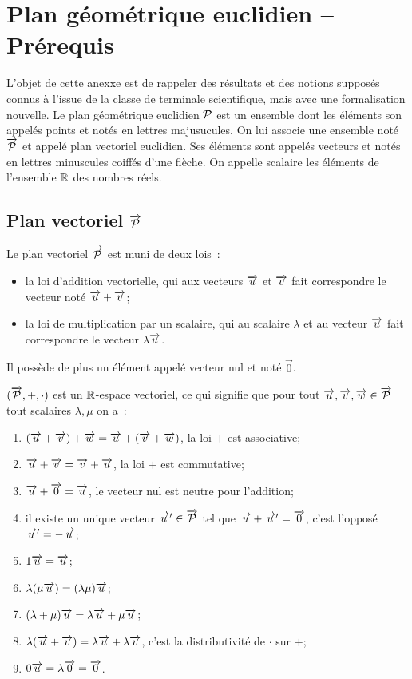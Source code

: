 \chapter{Plan géométrique euclidien -- Prérequis}

L'objet de cette anexxe est de rappeler des résultats et des notions supposés connus à l'issue de la classe de terminale scientifique, mais avec une formalisation nouvelle. Le plan géométrique euclidien $\P$ est un ensemble dont les éléments son appelés points et notés en lettres majusucules. On lui associe une ensemble noté $\vect{\P}$ et appelé plan vectoriel euclidien. Ses éléments sont appelés vecteurs et notés en lettres minuscules coiffés d'une flèche. On appelle scalaire les éléments de l'ensemble $\R$ des nombres réels.

\section{Plan vectoriel $\protect\vect{\P}$}

Le plan vectoriel $\vect{\P}$ est muni de deux lois~:
\begin{itemize}
\item la loi d'addition vectorielle, qui aux vecteurs $\vu$ et $\vv$ fait correspondre le vecteur noté $\vu +\vv$;
\item la loi de multiplication par un scalaire, qui au scalaire $\lambda$ et au vecteur $\vu$ fait correspondre le vecteur $\lambda \vu$.
\end{itemize}

Il possède de plus un élément appelé vecteur nul et noté $\vec{0}$.

\begin{prop}
  $(\vect{\P}, +, \cdot)$ est un $\R$-espace vectoriel, ce qui signifie que pour tout $\vu,\vv,\vw \in \vect{\P}$ tout scalaires $\lambda,\mu$ on a~:
  \begin{enumerate}
  \item $(\vu+\vv)+\vw=\vu +(\vv+\vw)$, la loi $+$ est associative;
  \item $\vu+\vv=\vv+\vu$, la loi $+$ est commutative;
  \item $\vu+\vect{0}=\vu$, le vecteur nul est neutre pour l'addition;
  \item il existe un unique vecteur $\vu' \in \vect{\P}$ tel que $\vu+\vu'=\vect{0}$, c'est l'opposé $\vu'=-\vu$;
  \item $1 \vu=\vu$;
  \item $\lambda(\mu \vu)=(\lambda \mu) \vu$;
  \item $(\lambda+\mu) \vu = \lambda\vu +\mu\vu$;
  \item $\lambda(\vu+\vv)=\lambda \vu +\lambda\vv$, c'est la distributivité de $\cdot$ sur $+$;
  \item $0 \vu = \lambda \vect{0}=\vect{0}$.
  \end{enumerate}
\end{prop}

